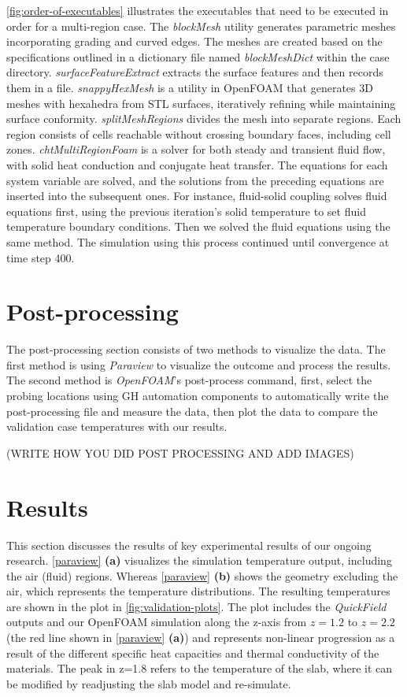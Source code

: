 \ref{fig:order-of-executables} illustrates the executables that need to be executed in order for a multi-region case.
The \textit{blockMesh} utility generates parametric meshes incorporating grading and curved edges. 
The meshes are created based on the specifications outlined in a dictionary file named \textit{blockMeshDict}  within the case directory.
\textit{surfaceFeatureExtract} extracts the surface features and then records them in a file.      
\textit{snappyHexMesh} is a utility in OpenFOAM that generates 3D meshes with hexahedra from STL surfaces, iteratively refining while maintaining surface conformity.
\textit{splitMeshRegions} divides the mesh into separate regions. Each region consists of cells reachable without crossing boundary faces, including cell zones.
\textit{chtMultiRegionFoam} is a solver for both steady and transient fluid flow, with solid heat conduction and conjugate heat transfer. The equations for each system variable are solved, and the solutions from the preceding equations are inserted into the subsequent ones. For instance, fluid-solid coupling solves fluid equations first, using the previous iteration's solid temperature to set fluid temperature boundary conditions. Then we solved the fluid equations using the same method. The simulation using this process continued until convergence at time step 400.
    



\section{Post-processing}
The post-processing section consists of two methods to visualize the data. The first method is using \textit{Paraview} to visualize the outcome and process the results. The second method is \textit{OpenFOAM}'s post-process command, first, select the probing locations using GH automation components to automatically write the post-processing file and measure the data, then plot the data to compare the validation case temperatures with our results. 

(WRITE HOW YOU DID POST PROCESSING AND ADD IMAGES)


\section{Results}
This section discusses the results of key experimental results of our ongoing research. 
\cref{paraview} \textbf{(a)} visualizes the simulation temperature output, including the air (fluid) regions. Whereas
\cref{paraview} \textbf{(b)} shows the geometry excluding the air, which represents the temperature distributions. The resulting temperatures are shown in the plot in \cref{fig:validation-plots}. The plot includes the \textit{QuickField} outputs and our OpenFOAM simulation along the z-axis from $z= 1.2$ to $z=2.2$ (the red line shown in \cref{paraview} \textbf{(a)}) and represents non-linear progression as a result of the different specific heat capacities and thermal conductivity of the materials. The peak in z=1.8 refers to the temperature of the slab, where it can be modified by readjusting the slab model and re-simulate. 



